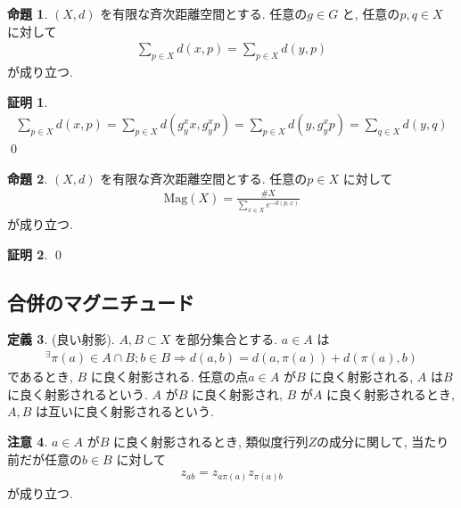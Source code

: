 \documentclass[10pt, fleqn, label-section=none]{bxjsarticle}
\theoremstyle{definition}
\newtheorem{dfn}{定義}[section]
\newtheorem{prop}[dfn]{命題}
\newtheorem*{pf*}{証明}
\newtheorem{remark}[dfn]{注意}
\newcommand{\naraba}{\Rightarrow}
\renewcommand{\;}{\, ; \,}
\newcommand{\Mag}{\textrm{Mag}}
\begin{document}
\begin{prop}$(X, d)$ を有限な斉次距離空間とする. 任意の$g \in G$ と, 任意の$p, q \in X$ に対して 
\begin{align*}  \sum_{p \in X} d(x, p) = \sum_{p \in X} d(y, p) \end{align*}
が成り立つ.
\end{prop}
\begin{pf*} 
\begin{align*} \sum_{p \in X} d(x, p) = \sum_{p \in X} d(g^x_y x, g^x_y p) = \sum_{p \in X} d(y, g^x_y p) = \sum_{q \in X} d(y, q)  \end{align*}
\qed
\end{pf*}




\begin{prop}$(X, d)$ を有限な斉次距離空間とする. 任意の$p \in X$ に対して 
\begin{align*} \Mag(X) = \frac{\# X}{\sum_{x \in X} e^{-d(p, x) } }  \end{align*}
が成り立つ.
\end{prop}
\begin{pf*}

\qed
\end{pf*}

\subsection{合併のマグニチュード}

\begin{dfn}(良い射影). $A, B \subset X$ を部分集合とする. $a \in A$ は 
\begin{align*} ^\exists \pi(a) \in A \cap B ; b \in B \naraba  d(a, b) = d(a, \pi (a)) + d(\pi (a), b) \end{align*}
であるとき, $B$ に良く射影される. 任意の点$a \in A$ が$B$ に良く射影される, $A$ は$B$ に良く射影されるという. $A$ が$B$ に良く射影され, $B$ が$A$ に良く射影されるとき, $A, B$ は互いに良く射影されるという. 
\end{dfn}

\begin{remark} $a \in A$ が$B$ に良く射影されるとき, 類似度行列$Z$の成分に関して, 当たり前だが任意の$b \in B$ に対して
\begin{align*} z_{a b} = z_{a \pi(a)} z_{\pi(a) b}\end{align*}
が成り立つ. 
\end{remark}
\end{document}
